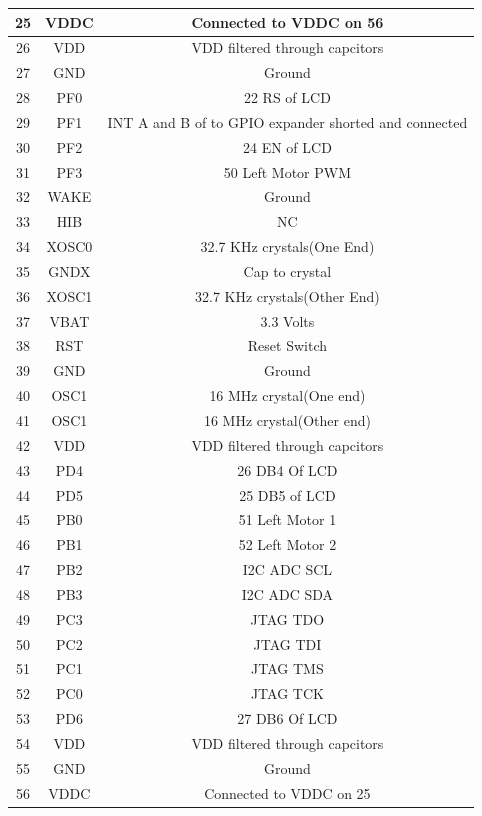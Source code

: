 \documentclass[a4paper,10pt,oneside]{article}
\begin{document}
{\begin{longtable}{|c|c|c|}
				25 &	VDDC &	Connected to VDDC on 56\\ \hline
				26 &	VDD	 &	VDD filtered through capcitors\\ \hline
				27 &	GND	 &	Ground\\ \hline
				28 &	PF0	 &	22 RS of LCD\\ \hline
				29 &	PF1	 &	INT A and B of to GPIO expander shorted and connected\\ \hline
				30 &	PF2 &	24 EN of LCD\\ \hline
				31 &	PF3	 &	50 Left Motor PWM\\ \hline
				32 &	WAKE &	Ground\\ \hline
				33 &	HIB &	NC\\ \hline
				34 &	XOSC0 &	32.7 KHz crystals(One End)\\ \hline
				35 &	GNDX &	Cap to crystal\\ \hline
				36 &	XOSC1 &	32.7 KHz crystals(Other End)\\  \hline
				37 &	VBAT &	3.3 Volts\\ \hline
				38 &	RST	 &	Reset Switch\\ \hline
				39 &	GND	 &	Ground\\ \hline
				40 &	OSC1 &	16 MHz crystal(One end)\\ \hline
				41 &	OSC1 &	16 MHz crystal(Other end)\\ \hline
				42 &	VDD	 &	VDD filtered through capcitors\\ \hline
				43 &	PD4	 &	26 DB4 Of LCD \\ \hline
				44 &	PD5	 &	25 DB5 of LCD\\ \hline
				45 &	PB0	 &	51 Left Motor 1\\ \hline
				46 &	PB1	 &	52 Left Motor 2\\ \hline
				47 &	PB2	 &	I2C ADC SCL\\ \hline 
				48 &	PB3	 &	I2C ADC SDA\\ \hline
				49 &	PC3	 &	JTAG TDO\\ \hline
				50 &	PC2	 &	JTAG TDI\\ \hline
				51 &	PC1	 &	JTAG TMS\\ \hline
				52 &	PC0	 &	JTAG TCK\\ \hline
				53 &	PD6	 &	27 DB6 Of LCD\\ \hline
				54 &	VDD	 &	VDD filtered through capcitors\\ \hline
				55 &	GND	 &	Ground\\ \hline
				56 &	VDDC &	Connected to VDDC on 25\\ \hline

\end{longtable}}
\end{document}
